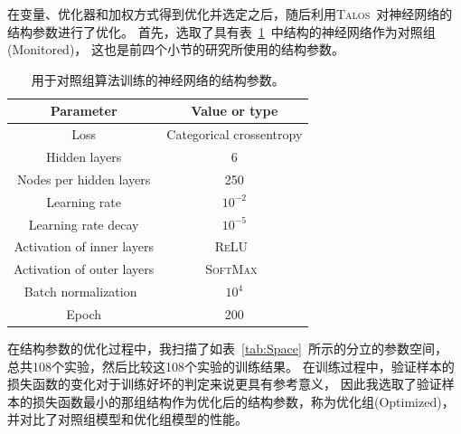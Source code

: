 在变量、优化器和加权方式得到优化并选定之后，随后利用\textsc{Talos}~\cite{TALOS}对神经网络的结构参数进行了优化。
首先，选取了具有表~\ref{tab:Hyper}~中结构的神经网络作为对照组(Monitored)，
这也是前四个小节的研究所使用的结构参数。

\begin{table}[ht]
\caption{用于对照组算法训练的神经网络的结构参数。}
\begin{center}
\begin{tabular}{c|c}
    \hline
    \hline
    Parameter & Value or type  \\
    \hline  
    Loss & Categorical crossentropy \\
    \hline  
    Hidden layers & 6 \\
    \hline  
    Nodes per hidden layers & 250 \\
    \hline  
    Learning rate & $10^{-2}$\\
    \hline  
    Learning rate decay & $10^{-5}$ \\
    \hline  
    Activation of inner layers & \textsc{ReLU}~\cite{Glorot:2011} \\
    \hline  
    Activation of outer layers & \textsc{SoftMax}~\cite{MLMIT} \\
    \hline  
    Batch normalization~\cite{Ioffe:2015} & $10^{4}$ \\
    \hline  
    Epoch & 200 \\
    \hline
    \hline
\end{tabular}
\end{center}
\label{tab:Hyper}
\end{table}

在结构参数的优化过程中，我扫描了如表~\ref{tab:Space}~所示的分立的参数空间，
总共108个实验，然后比较这108个实验的训练结果。
在训练过程中，验证样本的损失函数的变化对于训练好坏的判定来说更具有参考意义，
因此我选取了验证样本的损失函数最小的那组结构作为优化后的结构参数，称为优化组(Optimized)，
并对比了对照组模型和优化组模型的性能。

